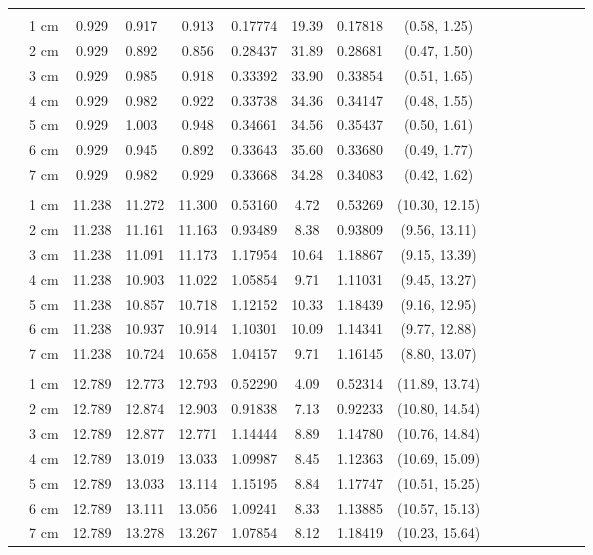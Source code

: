 \documentclass[a4paper 12pt]{article}
\numberwithin{equation}{section}
\begin{document}
\begin{small}
\begin{table}[h!]
\begin{footnotesize}
\begin{tabular}{clclclclclclclcl}
\raisebox{1ex}{\bf age 2} &  \\ [1.0ex]
&   1 cm & 0.929 &    0.917  & 0.913 &   0.17774& 19.39 & 0.17818 & (0.58, 1.25)\\
&   2 cm & 0.929 &    0.892  & 0.856 &   0.28437& 31.89 & 0.28681 & (0.47, 1.50) \\
&   3 cm & 0.929 &    0.985  & 0.918 &   0.33392& 33.90 & 0.33854 & (0.51, 1.65)\\
&   4 cm & 0.929 &    0.982  & 0.922 &   0.33738& 34.36 & 0.34147 & (0.48, 1.55)\\
&   5 cm & 0.929 &    1.003  & 0.948 &   0.34661& 34.56 & 0.35437 & (0.50, 1.61)\\
&   6 cm & 0.929 &    0.945  & 0.892 &   0.33643& 35.60 & 0.33680 & (0.49, 1.77)\\
&   7 cm & 0.929 &    0.982  & 0.929 &   0.33668& 34.28 & 0.34083 & (0.42, 1.62)\\[1.2ex]

 \raisebox{1ex}{\bf age 3} \\ [1.0ex]
&   1 cm & 11.238  &  11.272 & 11.300 &  0.53160& 4.72  & 0.53269 & (10.30, 12.15)\\
&   2 cm & 11.238  &  11.161 & 11.163 &  0.93489& 8.38  & 0.93809 & (9.56, 13.11)\\
&   3 cm & 11.238  &  11.091 & 11.173 &  1.17954& 10.64 & 1.18867 & (9.15, 13.39)\\
&   4 cm & 11.238  &  10.903 & 11.022 &  1.05854& 9.71  & 1.11031 & (9.45, 13.27)\\
&   5 cm & 11.238  &  10.857 & 10.718 &  1.12152& 10.33 & 1.18439 & (9.16, 12.95)\\
&   6 cm & 11.238  &  10.937 & 10.914 &  1.10301& 10.09 & 1.14341 & (9.77, 12.88)\\
&   7 cm & 11.238  &  10.724 & 10.658 &  1.04157& 9.71  & 1.16145 & (8.80, 13.07)\\[1.5ex]

 \raisebox{1ex}{\bf age 4} &  \\ [1.0ex]
 &  1 cm & 12.789 &   12.773 & 12.793 &  0.52290& 4.09 & 0.52314 & (11.89, 13.74) \\
 &  2 cm & 12.789 &   12.874 & 12.903 &  0.91838& 7.13 & 0.92233 & (10.80, 14.54) \\
 &  3 cm & 12.789 &   12.877 & 12.771 &  1.14444& 8.89 & 1.14780 & (10.76, 14.84) \\
 &  4 cm & 12.789 &   13.019 & 13.033 &  1.09987& 8.45 & 1.12363 & (10.69, 15.09) \\
 &  5 cm & 12.789 &   13.033 & 13.114 &  1.15195& 8.84 & 1.17747 & (10.51, 15.25) \\
 &  6 cm & 12.789 &   13.111 & 13.056 &  1.09241& 8.33 & 1.13885 & (10.57, 15.13) \\
 &  7 cm & 12.789 &   13.278 & 13.267 &  1.07854& 8.12 & 1.18419 & (10.23, 15.64) \\[1.2ex]


\end{tabular}
\end{footnotesize}
\end{table}
\end{small}
\end{document}

